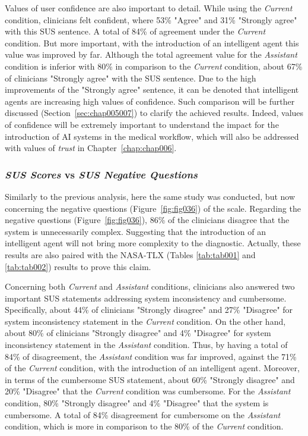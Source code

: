 Values of user confidence are also important to detail.
While using the {\it Current} condition, clinicians felt confident, where 53\% "Agree" and 31\% "Strongly agree" with this \ac{SUS} sentence.
A total of 84\% of agreement under the {\it Current} condition.
But more important, with the introduction of an intelligent agent this value was improved by far.
Although the total agreement value for the {\it Assistant} condition is inferior with 80\% in comparison to the {\it Current} condition, about 67\% of clinicians "Strongly agree" with the \ac{SUS} sentence.
Due to the high improvements of the "Strongly agree" sentence, it can be denoted that intelligent agents are increasing high values of confidence.
Such comparison will be further discussed (Section~\ref{sec:chap005007}) to clarify the achieved results.
Indeed, values of confidence will be extremely important to understand the impact for the introduction of \ac{AI} systems in the medical workflow, which will also be addressed with values of {\it trust} in Chapter~\ref{chap:chap006}.

\subsubsection{{\it SUS Scores} vs {\it SUS Negative Questions}}
\label{sec:chap005006001002}

Similarly to the previous analysis, here the same study was conducted, but now concerning the negative questions (Figure~\ref{fig:fig036}) of the scale.
Regarding the negative questions (Figure~\ref{fig:fig036}), 86\% of the clinicians disagree that the system is unnecessarily complex.
Suggesting that the introduction of an intelligent agent will not bring more complexity to the diagnostic.
Actually, these results are also paired with the \ac{NASA-TLX} (Tables \ref{tab:tab001} and \ref{tab:tab002}) results to prove this claim.

Concerning both {\it Current} and {\it Assistant} conditions, clinicians also answered two important \ac{SUS} statements addressing system inconsistency and cumbersome.
Specifically, about 44\% of clinicians "Strongly disagree" and 27\% "Disagree" for system inconsistency statement in the {\it Current} condition.
On the other hand, about 80\% of clinicians "Strongly disagree" and 4\% "Disagree" for system inconsistency statement in the {\it Assistant} condition.
Thus, by having a total of 84\% of disagreement, the {\it Assistant} condition was far improved, against the 71\% of the {\it Current} condition, with the introduction of an intelligent agent.
Moreover, in terms of the cumbersome \ac{SUS} statement, about 60\% "Strongly disagree" and 20\% "Disagree" that the {\it Current} condition was cumbersome.
For the {\it Assistant} condition, 80\% "Strongly disagree" and 4\% "Disagree" that the system is cumbersome.
A total of 84\% disagreement for cumbersome on the {\it Assistant} condition, which is more in comparison to the 80\% of the {\it Current} condition.

